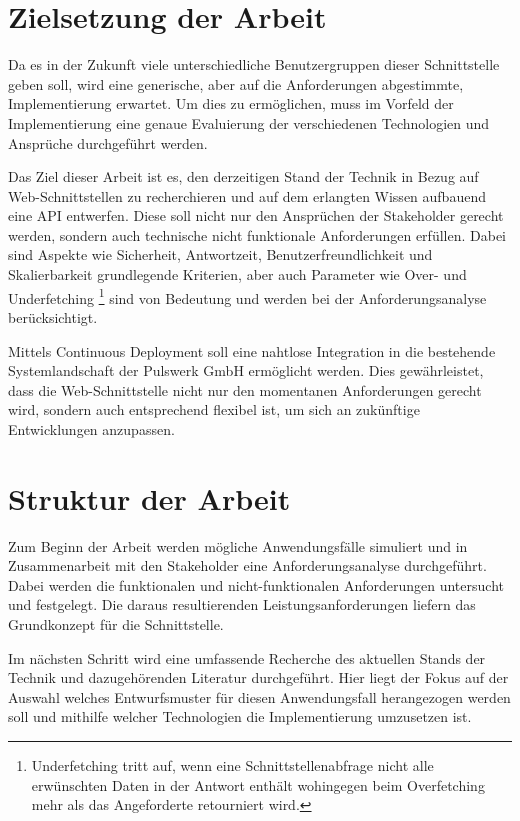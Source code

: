 \documentclass[draft,final]{vutinfth} %
\begin{document}
 
\section{Zielsetzung der Arbeit}

Da es in der Zukunft viele unterschiedliche Benutzergruppen dieser Schnittstelle geben soll, wird eine generische, aber auf die Anforderungen abgestimmte, Implementierung erwartet. 
Um dies zu ermöglichen, muss im Vorfeld der Implementierung eine genaue Evaluierung der verschiedenen Technologien und Ansprüche durchgeführt werden.
 
Das Ziel dieser Arbeit ist es, den derzeitigen Stand der Technik in Bezug auf Web-Schnittstellen zu recherchieren und auf dem erlangten Wissen aufbauend eine API entwerfen.
Diese soll nicht nur den Ansprüchen der Stakeholder gerecht werden, sondern auch technische nicht funktionale Anforderungen erfüllen.
Dabei sind Aspekte wie Sicherheit, Antwortzeit, Benutzerfreundlichkeit und Skalierbarkeit grundlegende Kriterien, aber auch Parameter wie Over- und Underfetching
\footnote{
	Underfetching tritt auf, wenn eine Schnittstellenabfrage nicht alle erwünschten Daten in der Antwort enthält wohingegen beim Overfetching mehr als das Angeforderte retourniert wird.
} 
sind von Bedeutung und werden bei der Anforderungsanalyse berücksichtigt. 

Mittels Continuous Deployment soll eine nahtlose Integration in die bestehende Systemlandschaft der Pulswerk GmbH ermöglicht werden. 
Dies gewährleistet, dass die Web-Schnittstelle nicht nur den momentanen Anforderungen gerecht wird, sondern auch entsprechend flexibel ist, um sich an zukünftige Entwicklungen anzupassen.


\section{Struktur der Arbeit}

Zum Beginn der Arbeit werden mögliche Anwendungsfälle simuliert und in Zusammenarbeit mit den Stakeholder eine Anforderungsanalyse durchgeführt. 
Dabei werden die funktionalen und nicht-funktionalen Anforderungen untersucht und festgelegt.
Die daraus resultierenden Leistungsanforderungen liefern das Grundkonzept für die Schnittstelle. 

Im nächsten Schritt wird eine umfassende Recherche des aktuellen Stands der Technik und dazugehörenden Literatur durchgeführt. 
Hier liegt der Fokus auf der Auswahl welches Entwurfsmuster für diesen Anwendungsfall herangezogen werden soll und mithilfe welcher Technologien die Implementierung umzusetzen ist. 
\end{document}
